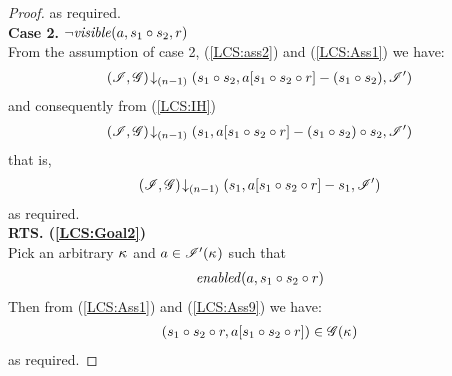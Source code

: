 \begin{lemma}
\begin{proof}
% 
as required.\\
%
\noindent\textbf{Case 2. }$\neg\mathit{visible}(a, s_1 \circ s_2, r)$\\
From the assumption of case 2, (\ref{LCS:ass2}) and (\ref{LCS:Ass1}) we have:
%
\begin{align*}
	\left(\mathscr{I}, \mathscr{G}\right) \!\downarrow_{(n-1)} \left(s_1 \circ s_2, a[s_1 \circ s_2 \circ r] - (s_1 \circ s_2), \mathscr{I}'\right)
\end{align*}
% 
and consequently from (\ref{LCS:IH})
%
\begin{align*}
	\left(\mathscr{I}, \mathscr{G}\right) \!\downarrow_{(n-1)} \left(s_1, a[s_1 \circ s_2 \circ r] - (s_1 \circ s_2) \circ s_2, \mathscr{I}'\right)
\end{align*}
% 
that is, 
%
\begin{align*}
	\left(\mathscr{I}, \mathscr{G}\right) \!\downarrow_{(n-1)} \left(s_1, a[s_1 \circ s_2 \circ r] - s_1, \mathscr{I}'\right)
\end{align*}
% 
as required.\\



\noindent\textbf{RTS. (\ref{LCS:Goal2})}\\
Pick an arbitrary $\kappa_{}$ and $a \in \mathscr{I}'(\kappa_{})$ such that 
\begin{align}
	\mathit{enabled}(a, s_1 \circ s_2 \circ r) \label{LCS:Ass9}
\end{align}
%
Then from (\ref{LCS:Ass1}) and (\ref{LCS:Ass9}) we have:
%
\begin{align}
	(s_1 \circ s_2 \circ r, a[s_1 \circ s_2 \circ r]) \in \mathscr{G}(\kappa_{}) \nonumber
\end{align}
% 
as required.


\end{proof}
\end{lemma}
